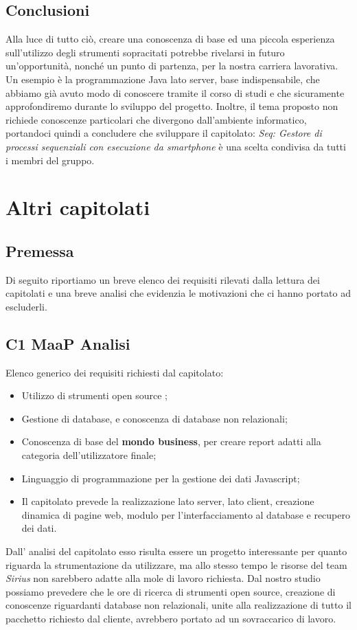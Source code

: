\subsection{Conclusioni}
 Alla luce di tutto ciò, creare una conoscenza di base ed una piccola esperienza sull'utilizzo degli strumenti sopracitati potrebbe rivelarsi in futuro un'opportunità, nonché un punto di partenza, per la nostra carriera lavorativa. Un esempio è la programmazione Java lato server, base indispensabile, che abbiamo già avuto modo di conoscere tramite il corso di studi e che sicuramente approfondiremo durante lo sviluppo del progetto. Inoltre, il tema proposto non richiede conoscenze particolari che divergono dall'ambiente informatico, portandoci quindi a concludere che sviluppare il capitolato: \textit{Seq: Gestore di processi sequenziali con esecuzione da smartphone} è una scelta condivisa da tutti i membri del gruppo. \\

\section{Altri capitolati}
\subsection{Premessa}
Di seguito riportiamo un breve elenco dei requisiti rilevati dalla lettura dei capitolati e una breve analisi che evidenzia le motivazioni che ci hanno portato ad escluderli.\\
\subsection{C1 MaaP Analisi}
Elenco generico dei requisiti richiesti dal capitolato:
\begin{itemize} 
\item Utilizzo di strumenti open source ;
\item Gestione di database, e conoscenza di database non relazionali;
\item Conoscenza di base del \textbf{mondo business}, per creare report adatti alla categoria dell'utilizzatore finale;
\item Linguaggio di programmazione per la gestione dei dati Javascript;
\item Il capitolato prevede la realizzazione lato server, lato client, creazione dinamica di pagine web, modulo per l'interfacciamento al database e recupero dei dati.
\end{itemize}
Dall' analisi del capitolato esso risulta essere un progetto interessante per quanto riguarda la strumentazione da utilizzare, ma allo stesso tempo le risorse del team \textit{Sirius} non sarebbero adatte alla mole di lavoro richiesta. Dal nostro studio possiamo prevedere che le ore di ricerca di strumenti open source, creazione di conoscenze riguardanti database non relazionali, unite alla realizzazione di tutto il pacchetto richiesto dal cliente, avrebbero portato ad un sovraccarico di lavoro.
\\
